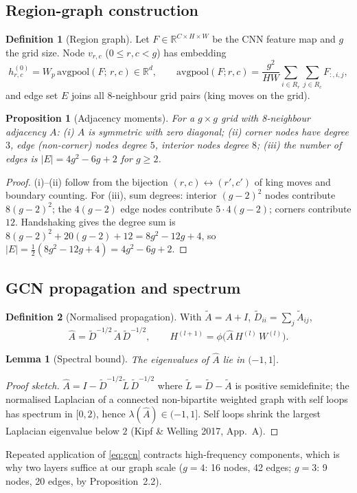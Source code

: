 \documentclass[11pt]{article}
\newtheorem{proposition}{Proposition}
\newtheorem{lemma}{Lemma}
\theoremstyle{definition}
\newtheorem{definition}{Definition}
\newcommand{\R}{\mathbb{R}}
\begin{document}
\subsection{Region-graph construction}
\begin{definition}[Region graph]
Let $F \in \R^{C \times H \times W}$ be the CNN feature map and $g$ the grid
size. Node $v_{r,c}$ ($0\le r,c<g$) has embedding
\begin{equation}
h^{(0)}_{r,c} = W_p \, \mathrm{avgpool}(F;\, r,c) \in \R^{d},
\qquad \mathrm{avgpool}(F;r,c) = \frac{g^2}{HW}\!\!\sum_{i \in R_r}\sum_{j \in R_c} F_{:,i,j},
\end{equation}
and edge set $E$ joins all 8-neighbour grid pairs (king moves on the grid).
\end{definition}
\begin{proposition}[Adjacency moments]
For a $g\times g$ grid with 8-neighbour adjacency $A$: (i) $A$ is symmetric
with zero diagonal; (ii) corner nodes have degree $3$, edge (non-corner)
nodes degree $5$, interior nodes degree $8$; (iii) the number of edges is
$|E| = 4g^2 - 6g + 2$ for $g \ge 2$.
\end{proposition}
\begin{proof}
(i)--(ii) follow from the bijection $(r,c)\leftrightarrow(r',c')$ of king
moves and boundary counting. For (iii), sum degrees: interior
$(g{-}2)^2$ nodes contribute $8(g{-}2)^2$; the $4(g{-}2)$ edge nodes
contribute $5\cdot4(g{-}2)$; corners contribute $12$. Handshaking gives
the degree sum is $8(g{-}2)^2+20(g{-}2)+12=8g^2-12g+4$, so
$|E|=\tfrac12(8g^2-12g+4)=4g^2-6g+2$.
\end{proof}

\subsection{GCN propagation and spectrum}
\begin{definition}[Normalised propagation]
With $\tilde A = A + I$, $\tilde D_{ii}=\sum_j \tilde A_{ij}$,
\begin{equation}
\hat A = \tilde D^{-1/2}\,\tilde A\,\tilde D^{-1/2},
\qquad H^{(l+1)} = \phi\!\big(\hat A\, H^{(l)}\, W^{(l)}\big).
\label{eq:gcn}
\end{equation}
\end{definition}
\begin{lemma}[Spectral bound]
The eigenvalues of $\hat A$ lie in $(-1, 1]$.
\end{lemma}
\begin{proof}[Proof sketch]
$\hat A = I - \tilde D^{-1/2} \tilde L\, \tilde D^{-1/2}$ where
$\tilde L = \tilde D - \tilde A$ is positive semidefinite; the normalised
Laplacian of a connected non-bipartite weighted graph with self loops has
spectrum in $[0, 2)$, hence $\lambda(\hat A) \in (-1, 1]$. Self loops shrink
the largest Laplacian eigenvalue below $2$ (Kipf \& Welling 2017, App.\ A).
\end{proof}
Repeated application of \eqref{eq:gcn} contracts high-frequency components,
which is why two layers suffice at our graph scale ($g{=}4$: 16 nodes, 42 edges; $g{=}3$: 9 nodes,
20 edges, by Proposition~2.2).
\end{document}

